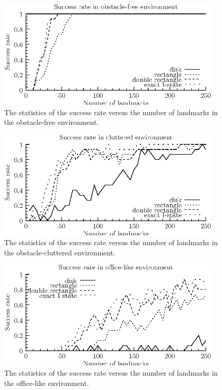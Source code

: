 \begin{figure}
  \begin{center}
    \includegraphics[width=0.95\textwidth]{figs/exp_num_blank}
  \end{center}
  \caption{The statistics of the success rate versus 
    the number of landmarks in the obstacle-free environment.}
  \label{fig:sucRate1}
\end{figure}
\begin{figure}
  \begin{center}
    \includegraphics[width=0.95\textwidth]{figs/exp_num_clutter}
  \end{center}
  \caption{The statistics of the success rate versus 
    the number of landmarks in the obstacle-cluttered environment.}
  \label{fig:sucRate2}
\end{figure}
\begin{figure}
  \begin{center}
    \includegraphics[width=0.95\textwidth]{figs/exp_num_cse}
  \end{center}
  \caption{The statistics of the success rate versus 
    the number of landmarks in the office-like environment.}
  \label{fig:sucRate3}
\end{figure}

